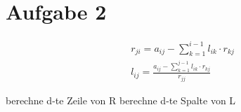 \section*{Aufgabe 2}
\begin{align}
	r_{ji} = a_{ij} - \sum_{k=1}^{i-1} l_{ik} \cdot r_{kj} \\
	l_{ij} = \frac{a_{ij} - \sum_{k=1}^{j-1} l_{ik} \cdot r_{kj}}{r_{jj}}
\end{align}


\begin{algorithm}
    \begin{algorithmic}
    		\State berechne d-te Zeile von R
    		\State berechne d-te Spalte von L
	\EndFor
    \end{algorithmic}
\end{algorithm}


